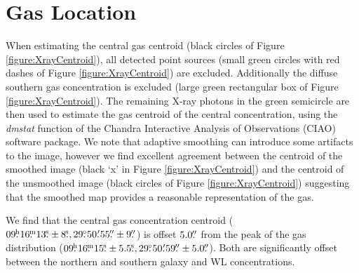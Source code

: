 \section{Gas Location}\label{section:GasLocation}

When estimating the central gas centroid (black circles of Figure \ref{figure:XrayCentroid}), all detected point sources (small green circles with red dashes of Figure \ref{figure:XrayCentroid}) are excluded.
Additionally the diffuse southern gas concentration is excluded (large green rectangular box of Figure \ref{figure:XrayCentroid}).
The remaining X-ray photons in the green semicircle are then used to estimate the gas centroid of the central concentration, using  the \textit{dmstat} function of the Chandra Interactive Analysis of Observations (CIAO) software package.
We note that adaptive smoothing can introduce some artifacts to the image, however we find excellent agreement between the centroid of the smoothed image (black `x' in Figure \ref{figure:XrayCentroid}) and the centroid of the unsmoothed image (black circles of Figure \ref{figure:XrayCentroid}) suggesting that the smoothed map provides a reasonable representation of the gas.

We find that the central gas concentration centroid ($09\fh16\fm13\fs\pm8\fs, 29\fdg50\farcm55\farcs\pm9\farcs$) is offset $5.0\mbox{$.\!\!^{\prime\prime}$}$ from the peak of the gas distribution ($09\fh16\fm15\fs\pm5.5\fs, 29\fdg50\farcm59\farcs\pm5.0\farcs$).
Both are significantly offset between the northern and southern galaxy and WL concentrations.

